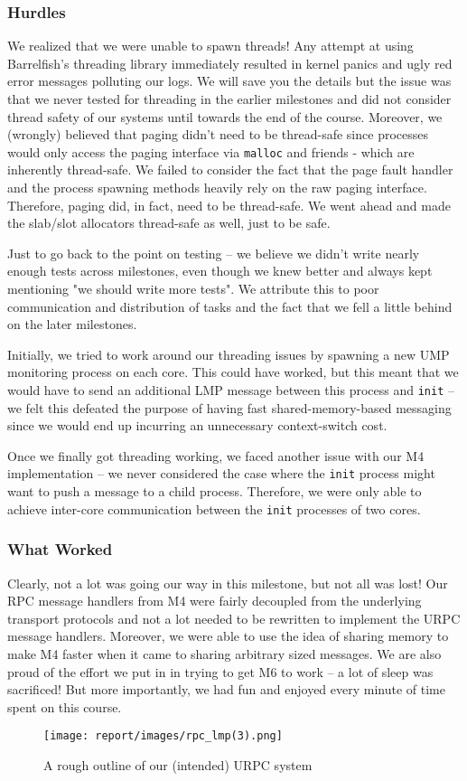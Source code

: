\subsubsection*{Hurdles} \label{sec:hurdles}
We realized that we were unable to spawn threads! Any attempt at using Barrelfish's threading library immediately resulted in kernel panics and ugly red error messages polluting our logs. We will save you the details but the issue was that we never tested for threading in the earlier milestones and did not consider thread safety of our systems until towards the end of the course. Moreover, we (wrongly) believed that paging didn't need to be thread-safe since processes would only access the paging interface via \verb|malloc| and friends - which are inherently thread-safe. We failed to consider the fact that the page fault handler and the process spawning methods heavily rely on the raw paging interface. Therefore, paging did, in fact, need to be thread-safe. We went ahead and made the slab/slot allocators thread-safe as well, just to be safe. 

Just to go back to the point on testing -- we believe we didn't write nearly enough tests across milestones, even though we knew better and always kept mentioning "we should write more tests". We attribute this to poor communication and distribution of tasks and the fact that we fell a little behind on the later milestones.

Initially, we tried to work around our threading issues by spawning a new UMP monitoring process on each core. This could have worked, but this meant that we would have to send an additional LMP message between this process and \verb|init| -- we felt this defeated the purpose of having fast shared-memory-based messaging since we would end up incurring an unnecessary context-switch cost.

Once we finally got threading working, we faced another issue with our M4 implementation -- we never considered the case where the \verb|init| process might want to push a message to a child process. Therefore, we were only able to achieve inter-core communication between the \verb|init| processes of two cores.
\subsubsection*{What Worked}
Clearly, not a lot was going our way in this milestone, but not all was lost! Our RPC message handlers from M4 were fairly decoupled from the underlying transport protocols and not a lot needed to be rewritten to implement the URPC message handlers. Moreover, we were able to use the idea of sharing memory to make M4 faster when it came to sharing arbitrary sized messages. We are also proud of the effort we put in in trying to get M6 to work -- a lot of sleep was sacrificed! But more importantly, we had fun and enjoyed every minute of time spent on this course.

\begin{figure}[h] 
	\texttt{[image: report/images/rpc\_lmp(3).png]}
	\caption{A rough outline of our (intended) URPC system}
	\label{figure:rough_idea}
	\centering
\end{figure}
